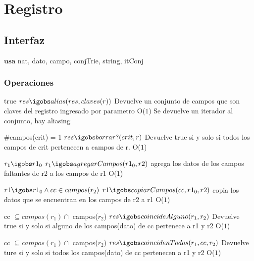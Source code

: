 
\section{Registro}

\subsection{Interfaz}

$\textbf{usa}$ {nat, dato, campo, conjTrie, string, itConj}




\subsubsection*{Operaciones}





 {true}
 {$res \igobs alias(res, claves(r))$}
 {Devuelve un conjunto de campos que son claves del registro ingresado por parametro}
 {O($1$)}
 {Se devuelve un iterador al conjunto, hay aliasing}

 {$\#$campos(crit) = 1}
 {$res \igobs borrar?(crit, r)$}
 {Devuelve true si y solo si todos los campos de crit pertenecen a campos de r.}
 {O($1$)} 
 {}

 {$ r_1 \igobs r1_0 $}
 {$r_1 \igobs agregarCampos(r1_0, r2) $}
 {agrega los datos de los campos faltantes de r2 a los campos de r1}
 {O($1$)} 
 {}
 
{$r1 \igobs r1_0 \land  cc \in campos(r_2) $}
{$r1 \igobs copiarCampos(cc, r1_0, r2)$}
{copia los datos que se encuentran en los campos de r2 a r1}
{O($1$)}
{}%

 {cc $\subseteq campos(r_1)\cap$ campos($r_2$)}
 {$res \igobs coincideAlguno(r_1, r_2)$}
 {Devuelve true si y solo si alguno de los campos(dato) de cc pertenece a r1 y r2}
 {O($1$)}
 {}
 
 {cc $\subseteq campos(r_1) \cap$ campos($r_2$)}
 {$res \igobs coincidenTodos(r_1, cc, r_2) $}
 {Devuelve ture si y solo si todos los campos(dato) de cc pertenecen a r1 y r2}
 {O($1$) } 
 {}
 
